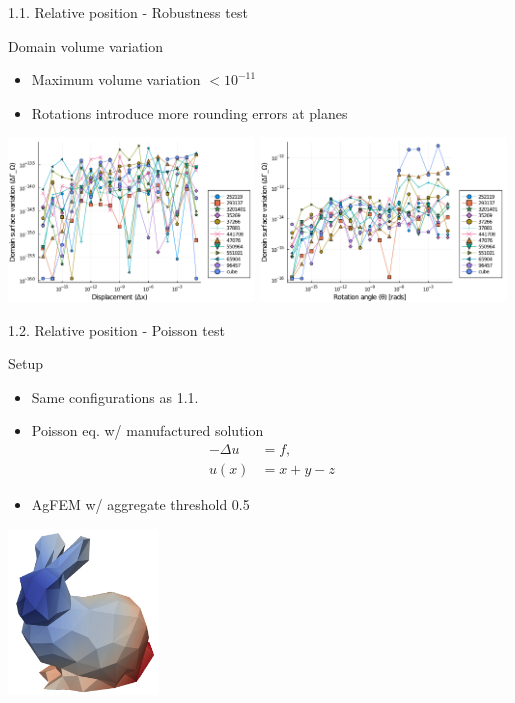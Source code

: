 \documentclass{beamer}
\begin{document}
\begin{frame}{1.1. Relative position - Robustness test}

  \begin{block}{Domain volume variation}
  \begin{itemize}
    \item
      Maximum volume variation $< 10^{-11}$
    \item
      Rotations introduce more rounding errors at planes
  \end{itemize}
  \end{block}

  \includegraphics[width=0.49\textwidth]{../analysis/plots/x_displacement_y_domain_surface}
  \includegraphics[width=0.49\textwidth]{../analysis/plots/x_rotation_y_domain_surface}
\end{frame}


\begin{frame}{1.2. Relative position - Poisson test}
  \begin{block}{Setup}
    \begin{itemize}
      \item
        Same configurations as 1.1.
      \item
        Poisson eq. w/ manufactured solution
        \begin{align*}
          -\Delta u &= f,\\
          u(x) &= x+y-z
        \end{align*}
      \item
        AgFEM w/ aggregate threshold 0.5
    \end{itemize}
  \end{block}
  
  \centering
  \includegraphics[width=0.3\textwidth]{bunny_poisson}
%
\end{frame}
\end{document}
